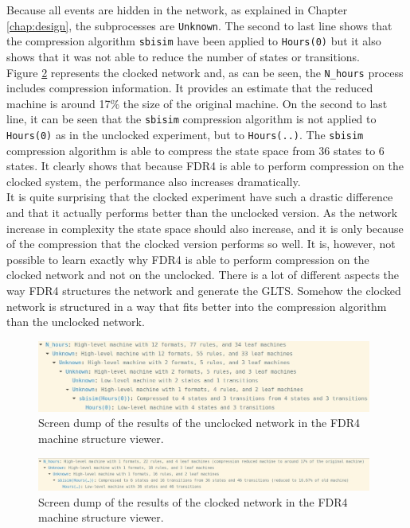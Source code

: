 Because all events are hidden in the network, as explained in Chapter \ref{chap:design}, the subprocesses are \texttt{Unknown}. The second to last line shows that the compression algorithm \texttt{sbisim} have been applied to \texttt{Hours(0)} but it also shows that it was not able to reduce the number of states or transitions. \\

Figure \ref{fig:clocked_compression} represents the clocked network and, as can be seen, the \texttt{N\_hours} process includes compression information. It provides an estimate that the reduced machine is around 17\% the size of the original machine. On the second to last line, it can be seen that the \texttt{sbisim} compression algorithm is not applied to \texttt{Hours(0)} as in the unclocked experiment, but to \texttt{Hours(..)}. The \texttt{sbisim} compression algorithm is able to compress the state space from 36 states to 6 states. It clearly shows that because FDR4 is able to perform compression on the clocked system, the performance also increases dramatically.\\

It is quite surprising that the clocked experiment have such a drastic difference and that it actually performs better than the unclocked version. As the network increase in complexity the state space should also increase, and it is only because of the compression that the clocked version performs so well. It is, however, not possible to learn exactly why FDR4 is able to perform compression on the clocked network and not on the unclocked. There is a lot of different aspects the way FDR4 structures the network and generate the GLTS. Somehow the clocked network is structured in a way that fits better into the compression algorithm than the unclocked network.
\begin{figure}
    \includegraphics[width=0.98\textwidth]{./figures/unclocked_compression.jpg}
\caption{Screen dump of the results of the unclocked network in the FDR4 machine structure viewer.}
\label{fig:unclocked_compression}
\end{figure}
\begin{figure}
    \includegraphics[width=0.98\textwidth]{./figures/clocked_compression.jpg}
\caption{Screen dump of the results of the clocked network in the FDR4 machine structure viewer.}
\label{fig:clocked_compression}
\end{figure}

